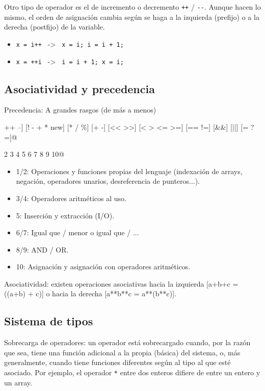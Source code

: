 \documentclass[a4paper]{article}
\begin{document}
	Otro tipo de operador es el de incremento o decremento \verb|++| / \verb|--|. Aunque hacen lo mismo, el orden de asignación cambia según se haga a la izquierda (prefijo) o a la derecha (postfijo) de la variable.
	\begin{itemize}
		\item \verb|x = i++ | -> \verb| x = i; i = i + 1;|
		\item \verb|x = ++i | -> \verb| i = i + 1; x = i;|
	\end{itemize}
	
	\subsection{Asociatividad y precedencia}
	
	Precedencia: A grandes rasgos (de más a menos)
	
 \verb@[. => [] ++ --] [! - + * new] [* / \%] [+ -] [<< >>] [< > <= >=] [== !=] [&&] [||] [= ?=]@
 
               2          3      4       5         6         7     8     9    10@
 
 \begin{itemize}
 	\item 1/2: Operaciones y funciones propias del lenguaje (indexación de arrays, negación, operadores unarios, desreferencia de punteros...).
 	\item 3/4: Operadores aritméticos al uso.
 	\item 5: Inserción y extracción (I/O).
 	\item 6/7: Igual que / menor o igual que / ...
 	\item 8/9: AND / OR.
 	\item 10: Asignación y asignación con operadores aritméticos.
 \end{itemize}

	Asociatividad: existen operaciones asociativas hacia la izquierda [a+b+c = ((a+b) + c)] o hacia la derecha [a**b**c = a**(b**c)].

	\subsection{Sistema de tipos}
	Sobrecarga de operadores: un operador está sobrecargado cuando, por la razón que sea, tiene una función adicional a la propia (básica) del sistema, o, más generalmente, cuando tiene funciones diferentes según al tipo al que esté asociado. Por ejemplo, el operador \verb|*| entre dos enteros difiere de entre un entero y un array.
	
\end{document}

